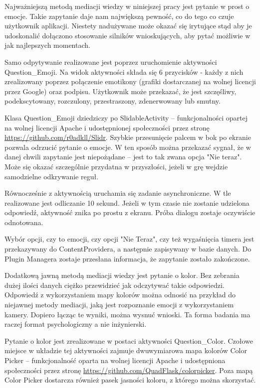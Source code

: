 Najważniejszą metodą mediacji wiedzy w niniejszej pracy jest pytanie w prost o emocje. Takie zapytanie daje nam największą pewność, co do tego co czuje użytkownik aplikacji. Niestety nadużywane może okazać się irytujące stąd aby je udoskonalić dołączono stosowanie silników wnioskujących, aby pytać możliwie w jak najlepszych momentach. 

Samo odpytywanie realizowane jest poprzez uruchomienie aktywności Question\_Emoji. Na widok aktywności składa się 6 przycisków - każdy z nich zrealizowany poprzez połączenie emotikony (grafiki dostarczanej na wolnej licencji przez Google) oraz podpisu. Użytkownik może przekazać, że jest szczęśliwy, podekscytowany, rozczulony, przestraszony, zdenerwowany lub smutny.

Klasa Question\_Emoji dziedziczy po SlidableActivity -- funkcjonalności opartej na wolnej licencji Apache i udostępnionej społeczności przez stronę \url{https://github.com/r0adkll/Slidr}. Szybkie przesunięcie palcem w bok po ekranie pozwala odrzucić pytanie o emocje. W ten sposób można przekazać sygnał, że w danej chwili zapytanie jest niepożądane -- jest to tak zwana opcja "Nie teraz". Może się okazać szczególnie przydatna w przyszłości, jeżeli w grę wejdzie samodzielne odkrywanie reguł.

Równocześnie z aktywnością uruchamia się zadanie asynchroniczne. W tle realizowane jest odliczanie 10 sekund. Jeżeli w tym czasie nie zostanie udzielona odpowiedź, aktywność znika po prostu z ekranu. Próba dialogu zostaje oczywiście odnotowana.

Wybór opcji, czy to emocji, czy opcji "Nie Teraz", czy też wygaśnięcia timera jest przekazywany do ContentProvidera, a następnie zapisywany w bazie danych. Do Plugin Managera zostaje przesłana informacja, że zapytanie zostało zakończone.

Dodatkową jawną metodą mediacji wiedzy jest pytanie o kolor. Bez zebrania dużej ilości danych ciężko przewidzieć jak odczytywać takie odpowiedzi. Odpowiedź z wykorzystaniem mapy kolorów można odnosić na przykład do niejawnej metody mediacji, jaką jest rozpoznanie emocji z wykorzystaniem kamery. Dopiero łącząc te wyniki, można wysnuć wnioski. Ta forma badania ma raczej format psychologiczny a nie inżynierski. 

Pytanie o kolor jest zrealizowane w postaci aktywności Question\_Color. Czołowe miejsce w układzie tej aktywności zajmuje dwuwymiarowa mapa kolorów Color Picker -- funkcjonalność oparta na wolnej licencji Apache i udostępniona społeczności przez stronę \url{https://github.com/QuadFlask/colorpicker}. Poza mapą Color Picker dostarcza również pasek jasności koloru, z którego można skorzystać. 

